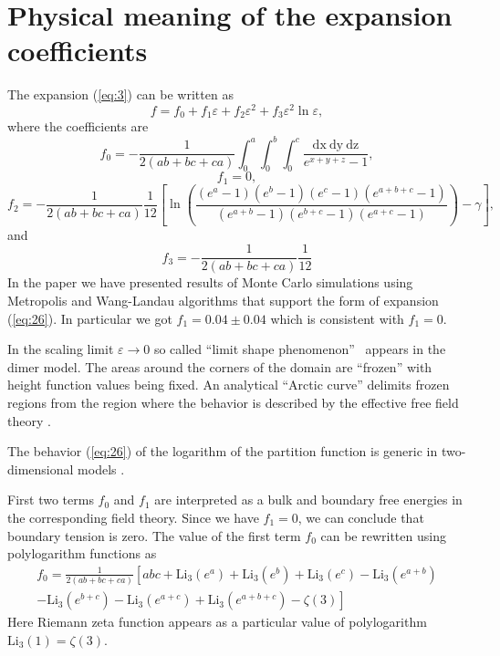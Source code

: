 \documentclass{article}
\newcommand{\Li}{\mathrm{Li}}
\newcommand{\dx}{\mathrm{dx}~}
\newcommand{\dy}{\mathrm{dy}~}
\newcommand{\dz}{\mathrm{dz}}
\begin{document}
\section{Physical meaning of the expansion coefficients}
\label{sec:accur-expans-phys}

The expansion  (\ref{eq:3}) can be written as
\begin{equation}
  \label{eq:26}
  f=f_{0}+f_{1}\varepsilon + f_{2}\varepsilon^{2} +f_{3}\varepsilon^{2}\ln\varepsilon,
\end{equation}
where the coefficients are
\begin{equation}
  \label{eq:27}
  f_{0}=-\frac{1}{2(ab+bc+ca)}\int_{0}^{a} \int_{0}^{b}\int_{0}^{c}\frac{\dx \dy \dz}{e^{x+y+z}-1},
\end{equation}
\begin{equation}
  \label{eq:28}
  f_{1}=0,
\end{equation}
\begin{equation}
  \label{eq:29}
  f_{2}=-\frac{1}{2(ab+bc+ca)}\frac{1}{12}\left[\ln\left(\frac{(e^{a}-1)(e^{b}-1)(e^{c}-1)(e^{a+b+c}-1)}{(e^{a+b}-1)(e^{b+c}-1)(e^{a+c}-1)}\right)-
    \gamma\right],
\end{equation}
and
\begin{equation}
  \label{eq:30}
  f_{3}=-\frac{1}{2(ab+bc+ca)}\frac{1}{12}
\end{equation}
In the paper \cite{belov2018finite} we have presented results of Monte Carlo simulations using
Metropolis and Wang-Landau algorithms that support the form of expansion (\ref{eq:26}). In
particular we got $f_{1}=0.04\pm 0.04$ which is consistent with $f_{1}=0$. 

In the scaling limit $\varepsilon\to 0$ so called ``limit shape phenomenon''~\cite{kenyon2006dimers}
appears in the dimer model. The areas around the corners of the domain are ``frozen'' with height
function values being fixed. An analytical ``Arctic curve'' delimits frozen regions from the region
where the behavior is described by the effective free field theory
\cite{kenyon2009lectures,kenyon2008height,kenyon2006dimers}.

The behavior (\ref{eq:26}) of the logarithm of the partition function is generic in two-dimensional
models \cite{cardy1988finite}.

First two terms $f_{0}$ and $f_{1}$ are interpreted as a bulk and
boundary free energies in the corresponding field theory. Since we have $f_{1}=0$, we can conclude
that boundary tension is zero.
The value of the first term $f_{0}$ can be rewritten using polylogarithm functions as
\begin{multline}
  \label{eq:34}
  f_{0}=\frac{1}{2(ab+bc+ca)}\left[abc + \Li_{3}(e^{a})+\Li_{3}(e^{b})+\Li_{3}(e^{c})-
    \Li_{3}(e^{a+b})\right.\\
  \left.-\Li_{3}(e^{b+c})-    \Li_{3}(e^{a+c})+    \Li_{3}(e^{a+b+c})-\zeta(3)\right]
\end{multline}
Here Riemann zeta function appears as a particular value of polylogarithm $\Li_{3}(1)=\zeta(3)$. 
\end{document}
